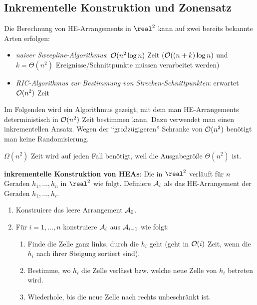 \pagebreak

\subsection{%
    Inkrementelle Konstruktion und Zonensatz%
}

Die Berechnung von HE-Arrangements in $\real^2$ kann auf zwei bereits bekannte Arten erfolgen:
\begin{itemize}
    \item
    \emph{naiver Sweepline-Algorithmus}:
    $\mathcal{O}(n^2 \log n)$ Zeit ($\mathcal{O}((n+k) \log n)$ und $k = \Theta(n^2)$ Ereignisse/Schnittpunkte
    müssen verarbeitet werden)
    
    \item
    \emph{RIC-Algorithmus zur Bestimmung von Strecken-Schnittpunkten}:
    erwartet $\mathcal{O}(n^2)$ Zeit
\end{itemize}
Im Folgenden wird ein Algorithmus gezeigt, mit dem man HE-Arrangements deterministisch in
$\mathcal{O}(n^2)$ Zeit bestimmen kann.
Dazu verwendet man einen inkrementellen Ansatz.
Wegen der "`großzügigeren"' Schranke von $\mathcal{O}(n^2)$ benötigt man keine Randomisierung.

$\Omega(n^2)$ Zeit wird auf jeden Fall benötigt, weil die Ausgabegröße $\Theta(n^2)$ ist.

\linie

\textbf{inkrementelle Konstruktion von HEAs}:
Die  in $\real^2$ verläuft für $n$ Geraden
$h_1, \dotsc, h_n$ in $\real^2$ wie folgt.
Definiere $\mathcal{A}_i$ als das HE-Arrangement der Geraden $h_1, \dotsc, h_i$.
\begin{enumerate}
    \item
    Konstruiere das leere Arrangement $\mathcal{A}_0$.
    
    \item
    Für $i = 1, \dotsc, n$ konstruiere $\mathcal{A}_i$ aus $\mathcal{A}_{i-1}$ wie folgt:
    \begin{enumerate}
        \item
        Finde die Zelle ganz links, durch die $h_i$ geht
        (geht in $\mathcal{O}(i)$ Zeit, wenn die $h_i$ nach ihrer Steigung sortiert sind).
        
        \item
        Bestimme, wo $h_i$ die Zelle verlässt bzw. welche neue Zelle von $h_i$ betreten wird.
        
        \item
        Wiederhole, bis die neue Zelle nach rechts unbeschränkt ist.
    \end{enumerate}
\end{enumerate}

